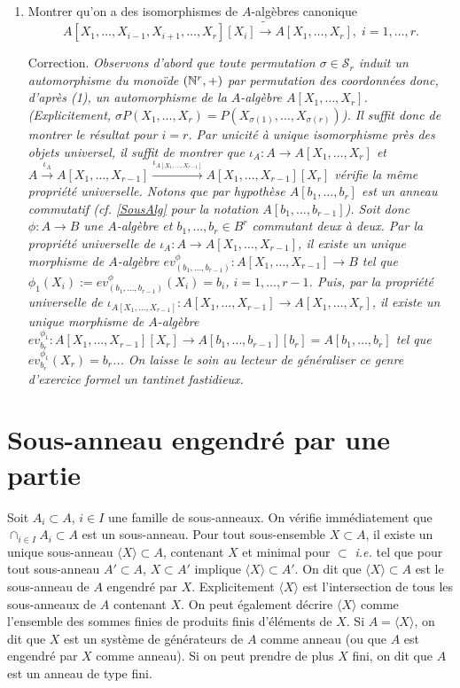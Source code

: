 \begin{enumerate}[leftmargin=* ,parsep=0cm,itemsep=0cm,topsep=0cm]
\item Montrer qu'on a des isomorphismes de $A$-algèbres canonique $$  A[X_1,\dots,X_{i-1},X_{i+1},\dots, X_r][X_i]\tilde{\rightarrow} A[X_1,\dots,X_r],\; i=1,\dots, r.$$

   Correction. \textit{Observons d'abord que toute permutation $\sigma\in \mathcal{S}_r$ induit un automorphisme du monoïde $(\mathbb{N}^r,+)$ par permutation des coordonnées donc, d'après (1), un automorphisme de la $A$-algèbre $A[X_1,\dots, X_r]$. (Explicitement, $\sigma P(X_1,\dots, X_r)=P(X_{\sigma(1)},\dots, X_{\sigma(r)})$). Il suffit donc de montrer le résultat pour $i=r$. Par unicité  à unique isomorphisme près des objets universel, il suffit de montrer que 
$\iota_A:A\rightarrow A[X_1,\dots, X_r]$ et $A\stackrel{\iota_A}{\rightarrow} A[X_1,\dots, X_{r-1}]\stackrel{\iota_{A[X_1,\dots, X_{r-1}]}}{\rightarrow} A[X_1,\dots, X_{r-1}][X_r]$ vérifie la même propriété universelle. Notons que par hypothèse  $A[b_1,\dots ,b_r]$ est un anneau commutatif (\textit{cf.} \ref{SousAlg} pour la notation $A[b_1,\dots, b_{r-1}]$). Soit donc $\phi:A\rightarrow B$ une $A$-algèbre et $b_1,\dots, b_r\in B^r$ commutant deux à deux. Par la propriété universelle de $\iota_A:A\rightarrow A[X_1,\dots, X_{r-1}]$, il existe un unique morphisme de $A$-algèbre $ev_{(b_1,\dots, b_{r-1})}^\phi:A[X_1,\dots,X_{r-1}]\rightarrow B$ tel que $\phi_1(X_i):=ev_{(b_1,\dots, b_{r-1})}^\phi(X_i)=b_i$, $i=1,\dots, r-1$. Puis, par la propriété universelle de $\iota_{A[X_1,\dots, X_{r-1}]}:A[X_1,\dots, X_{r-1}]\rightarrow A[X_1,\dots, X_r]$, il existe un unique morphisme de $A$-algèbre $ev_{b_r}^{\phi_1}:A[X_1,\dots,X_{r-1}][X_r]\rightarrow A[b_1,\dots ,b_{r-1}][b_r]=A[b_1,\dots,b_r]$ tel que $ev_{b_r}^{\phi_1}(X_r)=b_r$... On laisse le soin au lecteur de généraliser ce genre d'exercice formel un tantinet fastidieux.} \\
 
  \end{enumerate}
 
 

 
  \section{Sous-anneau engendré par une partie} Soit  $A_i\subset A$, $i\in I$ une famille de sous-anneaux. On vérifie immédiatement que $\cap_{i\in I}A_i\subset A$ est un sous-anneau. Pour tout sous-ensemble $X\subset A$, il existe 
un unique sous-anneau $\langle X\rangle \subset A$, contenant $X$ et minimal pour $\subset$ \textit{i.e.} tel que pour  tout sous-anneau $A'\subset A$,   $X\subset A'$ implique  $\langle X\rangle\subset A'$. On dit que $\langle X\rangle\subset A$ est le sous-anneau de $A$ engendré par $X$.  Explicitement $\langle X\rangle$ est l'intersection de tous les sous-anneaux de $A$ contenant $X$. On peut également décrire $\langle X\rangle$ comme  l'ensemble des sommes finies de produits finis d'éléments de $X$. Si $A=\langle X\rangle$, on dit que $X$ est un système de générateurs de $A$ comme anneau (ou que $A$ est engendré par $X$ comme anneau). Si on peut prendre de plus $X$ fini, on dit que $A$ est un anneau de type fini.\\


